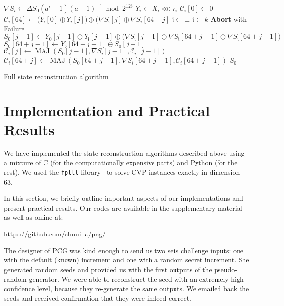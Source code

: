 \documentclass[journal=tosc,final]{iacrtrans}
\DeclareMathOperator{\MAJ}{MAJ}
\begin{document}
\begin{algorithm}
\begin{algorithmic}[1]
   
  \State $\nabla S_i \gets \Delta S_0 (a^i-1)(a-1)^{-1} \bmod 2^{128}$
  \State $Y_i \gets X_i \lll r_i$ 
  \State $\mathcal{C}_i[0] \gets 0$ 
  \State $\mathcal{C}_i[64] \gets \bigl( Y_i[0] \oplus Y_i[j] \bigr) \oplus \bigl( \nabla S_i[j] \oplus \nabla S_i[64+j]$
  \EndFor
   
  \State $\mathfrak{i} \gets \bot$ 
  \State $\mathfrak{i} \gets k$
  \EndIf
  \EndFor
   
  \State \textbf{Abort} with Failure
  \EndIf
  \State  {}
  \State $S_0[j-1] \gets Y_0[j-1] \oplus Y_{\mathfrak{i}}[j-1] \oplus \bigl( \nabla S_{\mathfrak{i}}[j-1] \oplus \nabla S_{\mathfrak{i}}[64+j-1] \oplus \nabla S_{\mathfrak{i}}[64 + j-1]\bigr)$
  \State $S_0[64 + j-1] \gets Y_0[64 + j-1] \oplus S_0[j-1]$
   
  \State $\mathcal{C}_i[j] \gets \MAJ(S_0[j-1], \nabla S_i[j-1], \mathcal{C}_i[j-1])$
  \State $\mathcal{C}_i[64 + j] \gets \MAJ(S_0[64+j-1], \nabla S_i[64+j-1], \mathcal{C}_i[64+j-1])$
  \EndFor
  \EndFor
  \State \Return $S_0$
  \EndFunction
\end{algorithmic}
\caption{Full state reconstruction algorithm}
\label{algo:last}
\end{algorithm}

\section{Implementation and Practical Results}
\label{sec:implem}

We have implemented the state reconstruction algorithms described above using a
mixture of \textsf{C} (for the computationally expensive parts) and
\textsf{Python} (for the rest). We used the \texttt{fplll} library~\cite{fplll}
to solve CVP instances exactly in dimension 63.

In this section, we briefly outline important aspects of our implementations and
present practical results. Our codes are available in the supplementary material
as well as online at:
\begin{center}
  \url{https://github.com/cbouilla/pcg/}
\end{center}
The designer of \textsf{PCG} was kind enough to send us two sets challenge
inputs: one with the default (known) increment and one with a random secret
increment. She generated random seeds and provided us with the first outputs of
the pseudo-random generator. We were able to reconstruct the seed with an
extremely high confidence level, because they re-generate the same outputs. We
emailed back the seeds and received confirmation that they were indeed correct.
\end{document}
